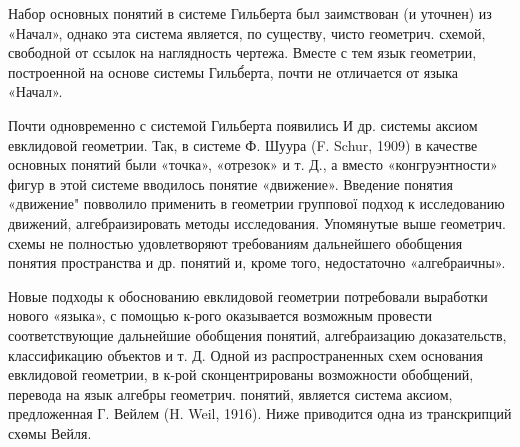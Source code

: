\documentclass[10pt]{article}
\begin{document}
Набор основных понятий в системе Гильберта был заимствован (и уточнен) из «Начал», однако эта система является, по существу, чисто геометрич. схемой, свободной от ссылок на наглядность чертежа. Вместе с тем язык геометрии, построенной на основе системы Гильб́ерта, почти не отличается от языка «Начал».

Почти одновременно с системой Гильберта появились И др. системы аксиом евклидовой геометрии. Так, в системе Ф. Шуура (F. Schur, 1909) в качестве основных понятий были «точка», «отрезок» и т. Д., а вместо «конгруэнтности» фигур в этой системе вводилось понятие «движение». Введение понятия «движение" повволило применить в геометрии группової подход к исследованию движений, алгебраизировать методы исследования. Упомянутые выше геометрич. схемы не полностью удовлетворяют требованиям дальнейшего обобщения понятия пространства и др. понятий и, кроме того, недостаточно «алгебраичны».

Новые подходы к обоснованию евклидовой геометрии потребовали выработки нового «языка», с помощью к-рого оказывается возможным провести соответствующие дальнейшие обобщения понятий, алгебраизацию доказательств, классификацию объектов и т. Д. Одной из распространенных схем основания евклидовой геометрии, в к-рой сконцентрированы возможности обобщений, перевода на язык алгебры геометрич. понятий, является система аксиом, предложенная Г. Вейлем (H. Weil, 1916). Ниже приводится одна из транскрипций схөмы Вейля.
\end{document}
